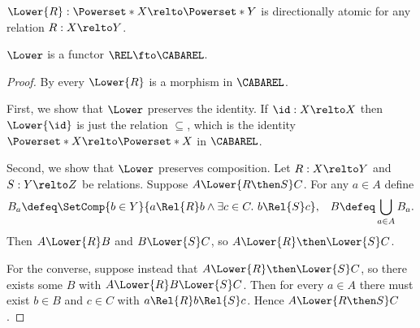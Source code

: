 \begin{lemma}\label{lemma:lower-then-cabarel}
   \(\Lower{R} : \Powerset*{X} \relto \Powerset*{Y}\) is directionally atomic
   for any relation \(R : X \relto Y\).
\end{lemma}
%
%
%

\begin{lemma}\label{lemma:lower-functor}
  \(\Lower\) is a functor \(\REL \fto \CABAREL\).
\end{lemma}
\begin{proof}

  By  every \(\Lower{R}\) is a morphism in
  \(\CABAREL\).

  First, we show that \(\Lower\) preserves the identity. If \(\id : X \relto X\)
  then \(\Lower{\id}\) is just the relation \(\subseteq\), which is the identity
  \(\Powerset*{X} \relto \Powerset*{X}\) in \(\CABAREL\).

  Second, we show that \(\Lower\) preserves composition. Let \(R : X \relto Y\)
  and \(S : Y \relto Z\) be relations. Suppose \(A \Lower{R \then S} C\). For
  any \(a \in A\) define
  \begin{align*}
    B_a \defeq
    \SetComp{b \in Y}{a \Rel{R} b \wedge \exists c \in C.\ b \Rel{S} c},
    &&
       B \defeq \bigcup_{a \in A} B_a.
  \end{align*}
  Then $A \Lower{R} B$ and $B \Lower{S} C$, so
  \(A \Lower{R} \then \Lower{S} C\).

  For the converse, suppose instead that \(A \Lower{R} \then \Lower{S} C\), so
  there exists some \(B\) with \(A \Lower{R} B \Lower{S} C\). Then for every
  \(a \in A\) there must exist \(b \in B\) and \(c \in C\) with
  \(a \Rel{R} b \Rel{S} c\). Hence \(A \Lower{R \then S} C\).
\end{proof}

